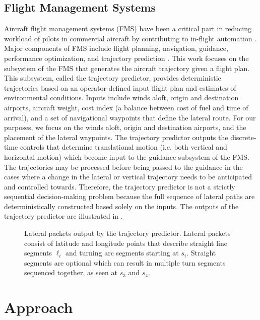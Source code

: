 \subsection{Flight Management Systems}
Aircraft flight management systems (FMS) have been a critical part in reducing workload of pilots in commercial aircraft by contributing to in-flight automation  \cite{fms_workload}.
Major components of FMS include flight planning, navigation, guidance, performance optimization, and trajectory prediction \cite{fms}. 
This work focuses on the subsystem of the FMS that generates the aircraft trajectory given a flight plan.
This subsystem, called the trajectory predictor, provides deterministic trajectories based on an operator-defined input flight plan and estimates of environmental conditions.
Inputs include winds aloft, origin and destination airports, aircraft weight, cost index (a balance between cost of fuel and time of arrival), and a set of navigational waypoints that define the lateral route.
For our purposes, we focus on the winds aloft, origin and destination airports, and the placement of the lateral waypoints.
The trajectory predictor outputs the discrete-time controls that determine translational motion (i.e. both vertical and horizontal motion) which become input to the guidance subsystem of the FMS.
The trajectories may be processed before being passed to the guidance in the cases where a change in the lateral or vertical trajectory needs to be anticipated and controlled towards.
Therefore, the trajectory predictor is not a strictly sequential decision-making problem because the full sequence of lateral paths are deterministically constructed based solely on the inputs.
The outputs of the trajectory predictor are illustrated in .

\begin{figure*}[!t]
\centering
\resizebox{0.78\textwidth}{!}{}
\caption{Lateral packets output by the trajectory predictor. Lateral packets consist of latitude and longitude points that describe straight line segments $\ell_i$ and turning arc segments starting at $s_i$. Straight segments are optional which can result in multiple turn segments sequenced together, as seen at $s_3$ and $s_4$.}
\label{fig:lateral_packets}
\end{figure*}



\section{Approach}
\label{sec:ast_approach}

